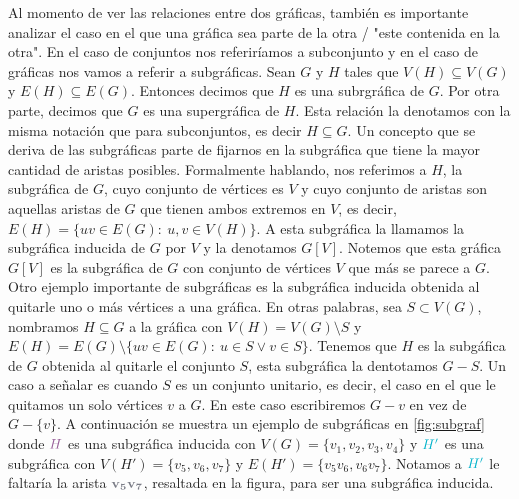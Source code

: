 Al momento de ver las relaciones entre dos gr\'aficas, tambi\'en es importante
analizar el caso en el que una gr\'afica sea parte de la otra / "este contenida
en la otra". En el caso de conjuntos nos referir\'iamos a subconjunto y en el
caso de gr\'aficas nos vamos a referir a subgr\'aficas. Sean $G$ y $H$ tales que
$V(H) \subseteq V(G)$ y $E(H) \subseteq E(G)$. Entonces decimos que $H$ es una
subrgr\'afica de $G$. Por otra parte, decimos que $G$ es una supergr\'afica de
$H$. Esta relaci\'on la denotamos con la misma notaci\'on que para subconjuntos,
es decir $H \subseteq G$. Un concepto que se deriva de las subgr\'aficas parte
de fijarnos en la subgr\'afica que tiene la mayor cantidad de aristas posibles.
Formalmente hablando, nos referimos a $H$, la subgr\'afica de $G$, cuyo conjunto
de v\'ertices es $V$ y cuyo conjunto de aristas son aquellas aristas de $G$ que
tienen ambos extremos en $V$, es decir, $E(H) = \{uv \in E(G) \colon\ u,v \in
V(H)\}$. A esta subgr\'afica la llamamos la subgr\'afica inducida de $G$ por
$V$ y la denotamos $G[V]$. Notemos que esta gr\'afica $G[V]$ es la subgr\'afica
de $G$ con conjunto de v\'ertices $V$ que m\'as se parece a $G$. Otro ejemplo
importante de subgr\'aficas es la subgr\'afica inducida obtenida al quitarle uno
o m\'as v\'ertices a una gr\'afica. En otras palabras, sea $S \subset V(G)$,
nombramos $H \subseteq G$ a la gr\'afica con $V(H)=V(G) \setminus S$ y $E(H) =
E(G)\setminus\{uv \in E(G) \colon\ u \in S \lor v \in S\}$. Tenemos que $H$ es
la subg\'afica de $G$ obtenida al quitarle el conjunto $S$, esta subgr\'afica la
dentotamos $G-S$. Un caso a se\~{n}alar es cuando $S$ es un conjunto unitario,
es decir, el caso en el que le quitamos un solo v\'ertices $v$ a $G$. En este
caso escribiremos $G-v$ en vez de $G-\{v\}$. A continuaci\'on se muestra un
ejemplo de subgr\'aficas en \cref{fig:subgraf} donde ${\color{morado}H}$ es una
subgr\'afica inducida con $V(G) = \{v_1,v_2,v_3,v_4\}$ y ${\color{azulCielo}H'}$
es una subgr\'afica con $V(H')=\{v_5,v_6,v_7\}$ y $E(H')=\{v_5v_6,  v_6v_7\}$.
Notamos a ${\color{azulCielo}H'}$ le faltar\'ia la arista
${\color{grisOscuro!80}\bf v_5v_7}$, resaltada en la figura, para ser una
subgr\'afica inducida. 


